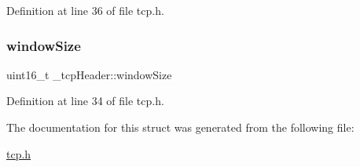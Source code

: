 Definition at line 36 of file tcp.\+h.

\mbox{\label{struct__tcpHeader_ab3caec0ac5bef36c592a52b800f73e5b}} 
\subsubsection{\texorpdfstring{window\+Size}{windowSize}}
{\footnotesize\ttfamily uint16\+\_\+t \+\_\+tcp\+Header\+::window\+Size}



Definition at line 34 of file tcp.\+h.



The documentation for this struct was generated from the following file\+:\begin{DoxyCompactItemize}
\item 
\hyperlink{tcp_8h}{tcp.\+h}\end{DoxyCompactItemize}
